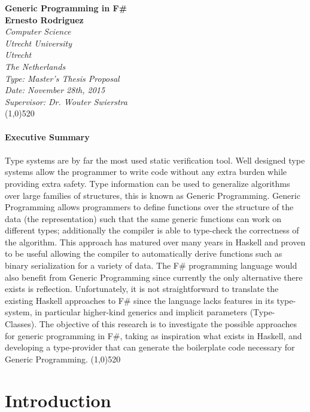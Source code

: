 \documentclass[8pt]{extarticle}
\author{Ernesto Rodriguez}
\begin{document}
\Huge{\bf Generic Programming in F\#\\[1cm]}
\large{\bf Ernesto Rodriguez\\[0.5cm]}
\emph{Computer Science \\ Utrecht University \\ Utrecht \\ The Netherlands \\[0.5cm]}
\emph{Type: Master's Thesis Proposal \\ Date: November 28th, 2015 \\ Supervisor: Dr. Wouter Swierstra\\}
\line(1,0){520}\\ \\
\Large{\bf Executive Summary\\ \\}
Type systems are by far the most used static verification tool. Well designed type systems allow the programmer to write code without any extra burden while providing extra safety. Type information can be used to generalize algorithms over large families of structures, this is known as Generic Programming. Generic Programming allows programmers to define functions over the structure of the data (the representation) such that the same generic functions can work on different types; additionally the compiler is able to type-check the correctness of the algorithm. This approach has matured over many years in Haskell and proven to be useful allowing the compiler to automatically derive functions such as binary serialization for a variety of data. The F\# programming language would also benefit from Generic Programming since currently the only alternative there exists is reflection. Unfortunately, it is not straightforward to translate the existing Haskell approaches to F\# since the language lacks features in its type-system, in particular higher-kind generics and implicit parameters (Type-Classes). The objective of this research is to investigate the possible approaches for generic programming in F\#, taking as inspiration what exists in Haskell, and developing a type-provider that can generate the boilerplate code necessary for Generic Programming.
\line(1,0){520}
\section{Introduction}
\end{document}
